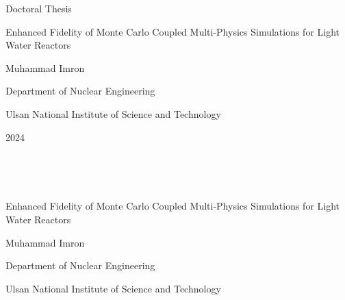 \documentclass[11pt,a4paper,onecolumn,oneside]{report}
\begin{document}


\begin{center}
\LARGE Doctoral Thesis

\vspace{3cm}
\huge Enhanced Fidelity of Monte Carlo Coupled Multi-Physics Simulations for Light Water Reactors

\vfill

\LARGE Muhammad Imron

\vspace{2cm}

\LARGE Department of Nuclear Engineering 

\vspace{2cm}

\LARGE Ulsan National Institute of Science and Technology
\vspace{2cm}

\LARGE 2024

\end{center}
\thispagestyle{empty}
\clearpage

\begin{center}
\hbox{ }

\hbox{ }

\huge Enhanced Fidelity of Monte Carlo Coupled Multi-Physics Simulations for Light Water Reactors 

\vspace{5cm}

\LARGE Muhammad Imron

\vspace{6cm}

\LARGE Department of Nuclear Engineering 

\vspace{2cm}

\LARGE Ulsan National Institute of Science and Technology

\end{center}
\thispagestyle{empty}
\clearpage

%
\end{document}
